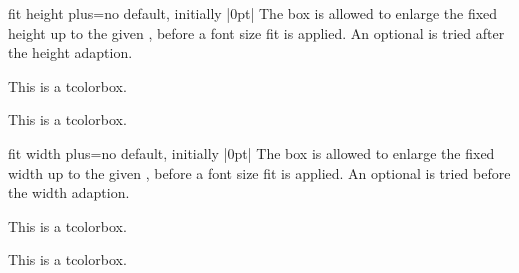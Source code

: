 \clearpage
\begin{docTcbKey}{fit height plus}{=}{no default, initially |0pt|}
  The box is allowed to enlarge the fixed height up to the given ,
  before a font size fit is applied. An optional 
  is tried after the height adaption.
\begin{dispExample}

\begin{tcolorbox}[fit]
This is a tcolorbox.
\end{tcolorbox}
\begin{tcolorbox}[fit,fit height plus=1cm]
This is a tcolorbox.
\end{tcolorbox}
\begin{tcolorbox}[fit]
\lipsum[2]
\end{tcolorbox}
\begin{tcolorbox}[fit,fit height plus=1cm]
\lipsum[2]
\end{tcolorbox}
\end{dispExample}
\end{docTcbKey}


\begin{docTcbKey}{fit width plus}{=}{no default, initially |0pt|}
  The box is allowed to enlarge the fixed width up to the given ,
  before a font size fit is applied. An optional 
  is tried before the width adaption.
  \enlargethispage*{1cm}
\begin{dispExample}

\begin{tcolorbox}[fit]
This is a tcolorbox.
\end{tcolorbox}
\begin{tcolorbox}[fit,fit width plus=1cm]
This is a tcolorbox.
\end{tcolorbox}
\begin{tcolorbox}[fit]
\lipsum[2]
\end{tcolorbox}
\begin{tcolorbox}[fit,fit width plus=1cm]
\lipsum[2]
\end{tcolorbox}
\end{dispExample}
\end{docTcbKey}


